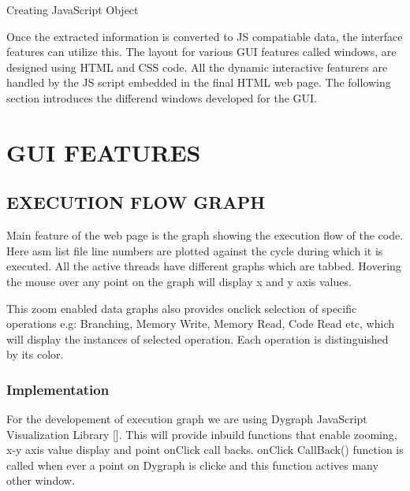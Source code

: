\IncMargin{1em}
\begin{algorithm}[H]
\DontPrintSemicolon
{} 
\KwFn {}
\BlankLine
{}
\caption{Creating JavaScript Object}
\end{algorithm}\DecMargin{1em}



Once the extracted information is converted to JS compatiable data, the interface features can utilize this. The layout for various GUI features called windows, are designed using HTML and CSS code. All the dynamic interactive featurers are handled by the JS script embedded in the final HTML web page. The following section introduces the differend windows developed for the GUI.

\section {GUI FEATURES}

\subsection {EXECUTION FLOW GRAPH}
Main feature of the web page is the graph showing the execution flow of the code. Here asm list file line numbers are plotted against the cycle during which it is executed. All the active threads have different graphs which are tabbed. Hovering the mouse over any point on the graph will display x and y axis values. 
 
This zoom enabled data graphs also provides onclick selection of specific operations e.g: Branching, Memory Write, Memory Read, Code Read etc, which will display the instances of selected operation. Each operation is distinguished by its color.   

\subsubsection {Implementation}

For the developement of execution graph we are using Dygraph JavaScript Visualization Library []. This will provide inbuild functions that enable zooming, x-y axis value display and point onClick call backs. onClick CallBack() function is called when ever a point on Dygraph is clicke and this function actives many other window.

